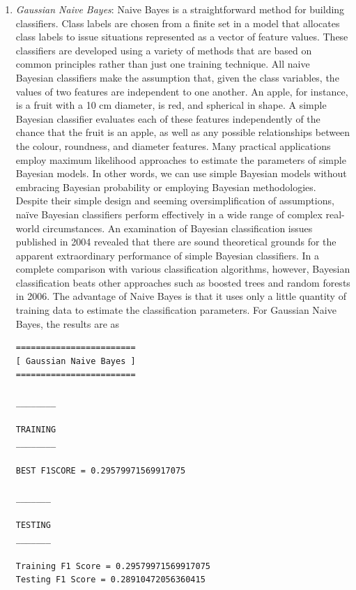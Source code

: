\documentclass[runningheads]{llncs}
\begin{document}
\begin{enumerate}
\begin{verbatim}
\end{verbatim}
\item \textit{Gaussian Naive Bayes}: Naive Bayes is a straightforward method for building classifiers. Class labels are chosen from a finite set in a model that allocates class labels to issue situations represented as a vector of feature values. These classifiers are developed using a variety of methods that are based on common principles rather than just one training technique.
All naive Bayesian classifiers make the assumption that, given the class variables, the values of two features are independent to one another. An apple, for instance, is a fruit with a 10 cm diameter, is red, and spherical in shape. A simple Bayesian classifier evaluates each of these features independently of the chance that the fruit is an apple, as well as any possible relationships between the colour, roundness, and diameter features. Many practical applications employ maximum likelihood approaches to estimate the parameters of simple Bayesian models. In other words, we can use simple Bayesian models without embracing Bayesian probability or employing Bayesian methodologies. Despite their simple design and seeming oversimplification of assumptions, naïve Bayesian classifiers perform effectively in a wide range of complex real-world circumstances. An examination of Bayesian classification issues published in 2004 revealed that there are sound theoretical grounds for the apparent extraordinary performance of simple Bayesian classifiers. In a complete comparison with various classification algorithms, however, Bayesian classification beats other approaches such as boosted trees and random forests in 2006. The advantage of Naive Bayes is that it uses only a little quantity of training data to estimate the classification parameters. For Gaussian Naive Bayes, the results are as
\begin{verbatim}
========================
[ Gaussian Naive Bayes ]
========================

________

TRAINING
________

BEST F1SCORE = 0.29579971569917075

_______

TESTING
_______

Training F1 Score = 0.29579971569917075
Testing F1 Score = 0.28910472056360415


\end{verbatim}
\end{enumerate}
\end{document}
